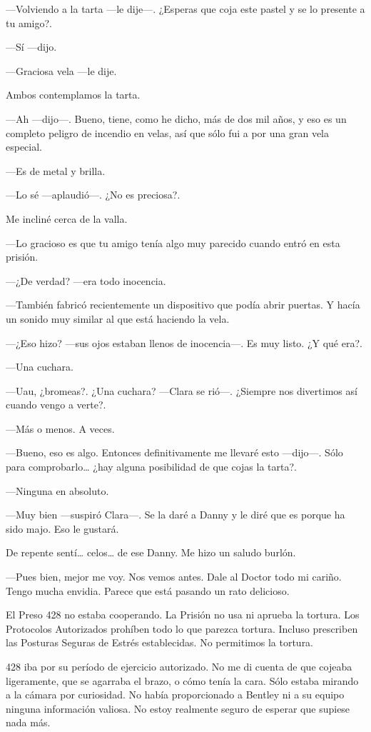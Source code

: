 ---Volviendo a la tarta ---le dije---. ¿Esperas que coja este pastel y
se lo presente a tu amigo?.

---Sí ---dijo.

---Graciosa vela ---le dije.

Ambos contemplamos la tarta.

---Ah ---dijo---. Bueno, tiene, como he dicho, más de dos mil años, y
eso es un completo peligro de incendio en velas, así que sólo fui a por
una gran vela especial.

---Es de metal y brilla.

---Lo sé ---aplaudió---. ¿No es preciosa?.

Me incliné cerca de la valla.

---Lo gracioso es que tu amigo tenía algo muy parecido cuando entró en
esta prisión.

---¿De verdad? ---era todo inocencia.

---También fabricó recientemente un dispositivo que podía abrir puertas.
Y hacía un sonido muy similar al que está haciendo la vela.

---¿Eso hizo? ---sus ojos estaban llenos de inocencia---. Es muy listo.
¿Y qué era?.

---Una cuchara.

---Uau, ¿bromeas?. ¿Una cuchara? ---Clara se rió---. ¿Siempre nos
divertimos así cuando vengo a verte?.

---Más o menos. A veces.

---Bueno, eso es algo. Entonces definitivamente me llevaré esto
---dijo---. Sólo para comprobarlo\ldots{} ¿hay alguna posibilidad de que
cojas la tarta?.

---Ninguna en absoluto.

---Muy bien ---suspiró Clara---. Se la daré a Danny y le diré que es
porque ha sido majo. Eso le gustará.

De repente sentí\ldots{} celos\ldots{} de ese Danny. Me hizo un saludo
burlón.

---Pues bien, mejor me voy. Nos vemos antes. Dale al Doctor todo mi
cariño. Tengo mucha envidia. Parece que está pasando un rato delicioso.

El Preso 428 no estaba cooperando. La Prisión no usa ni aprueba la
tortura. Los Protocolos Autorizados prohíben todo lo que parezca
tortura. Incluso prescriben las Posturas Seguras de Estrés establecidas.
No permitimos la tortura.

428 iba por su período de ejercicio autorizado. No me di cuenta de que
cojeaba ligeramente, que se agarraba el brazo, o cómo tenía la cara.
Sólo estaba mirando a la cámara por curiosidad. No había proporcionado a
Bentley ni a su equipo ninguna información valiosa. No estoy realmente
seguro de esperar que supiese nada más.

